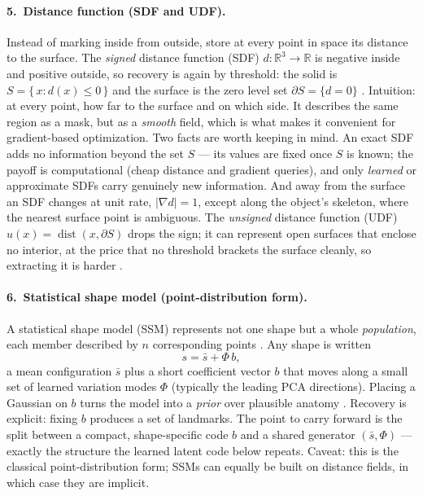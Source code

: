 %
\paragraph{5.~Distance function (SDF and UDF).} Instead of marking inside from outside,
store at every point in space its distance to the surface. The \emph{signed} distance
function (SDF) $d : \mathbb{R}^3 \to \mathbb{R}$ is negative inside and positive outside,
so recovery is again by threshold: the solid is $S = \{\, x : d(x) \le 0 \,\}$ and the
surface is the zero level set $\partial S = \{d = 0\}$
\citep{osher1988fronts, park2019deepsdf}. Intuition: at every point, how far to the
surface and on which side. It describes the same region as a mask, but as a \emph{smooth}
field, which is what makes it convenient for gradient-based optimization. Two facts are
worth keeping in mind. An exact SDF adds no information beyond the set $S$ --- its values
are fixed once $S$ is known; the payoff is computational (cheap distance and gradient
queries), and only \emph{learned} or approximate SDFs carry genuinely new information. And
away from the surface an SDF changes at unit rate, $|\nabla d| = 1$, except along the
object's skeleton, where the nearest surface point is ambiguous. The \emph{unsigned}
distance function (UDF) $u(x) = \operatorname{dist}(x, \partial S)$ drops the sign; it can
represent open surfaces that enclose no interior, at the price that no threshold brackets
the surface cleanly, so extracting it is harder \citep{chibane2020ndf}.

%
\paragraph{6.~Statistical shape model (point-distribution form).} A statistical shape
model (SSM) represents not one shape but a whole \emph{population}, each member described
by $n$ corresponding points \citep{cootes1995active, heimann2009statistical}. Any shape is
written
\[
    s = \bar{s} + \Phi\,b,
\]
a mean configuration $\bar{s}$ plus a short coefficient vector $b$ that moves along a small
set of learned variation modes $\Phi$ (typically the leading PCA directions). Placing a
Gaussian on $b$ turns the model into a \emph{prior} over plausible anatomy
\citep{ambellan2019statistical}. Recovery is explicit: fixing $b$ produces a set of
landmarks. The point to carry forward is the split between a compact, shape-specific code
$b$ and a shared generator $(\bar{s}, \Phi)$ --- exactly the structure the learned latent
code below repeats. Caveat: this is the classical point-distribution form; SSMs can equally
be built on distance fields, in which case they are implicit.

